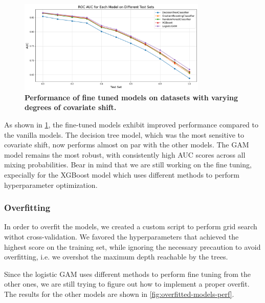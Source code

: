\begin{figure}[H]
    \centering
    \includegraphics[width=0.8\textwidth]{assets/tuned.png} 
    \caption{\textbf{Performance of fine tuned models on datasets with varying degrees of covariate shift.}}
    \label{fig:tuned-models-perf}
\end{figure}

As shown in \cref{fig:tuned-models-perf}, the fine-tuned models exhibit improved performance compared to the vanilla models. The decision tree model, which was the most sensitive to covariate shift, now performs almost on par with the other models. The GAM model remains the most robust, with consistently high AUC scores across all mixing probabilities.
Bear in mind that we are still working on the fine tuning, expecially for the XGBoost model which uses different methods to perform hyperparameter optimization.

\subsubsection{Overfitting}


In order to overfit the models, we created a custom script to perform grid search withot cross-validation. We favored the hyperparameters that achieved the highest score on the training set, while ignoring the necessary precaution to avoid overfitting, i.e. we overshot the maximum depth reachable by the trees.

Since the logistic GAM uses different methods to perform fine tuning from the other ones, we are still trying to figure out how to implement a proper overfit. The results for the other models are shown in \cref{fig:overfitted-models-perf}.

